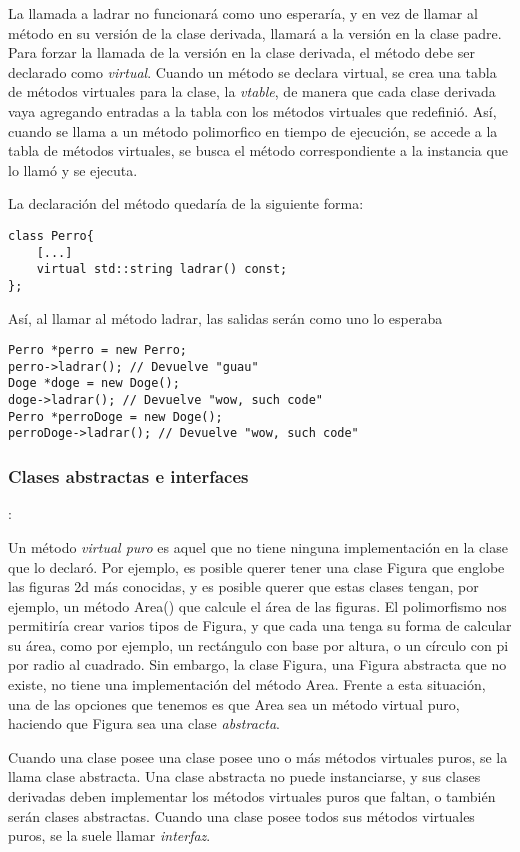 \documentclass[a4paper, twoside]{article}
\begin{document}
La llamada a ladrar no funcionará como uno esperaría, y en vez de llamar al método en su versión de la clase derivada, llamará a la versión en la clase padre.
Para forzar la llamada de la versión en la clase derivada, el método debe ser declarado como \emph{virtual}. Cuando un método se declara virtual, se crea una tabla de métodos virtuales para la clase, la \emph{vtable}, de manera que cada clase derivada vaya agregando entradas a la tabla con los métodos virtuales que redefinió.
Así, cuando se llama a un método polimorfico en tiempo de ejecución, se accede a la tabla de métodos virtuales, se busca el método correspondiente a la instancia que lo llamó y se ejecuta.

La declaración del método quedaría de la siguiente forma:

\begin{lstlisting}
class Perro{
	[...]
	virtual std::string ladrar() const;
};
\end{lstlisting}

Así, al llamar al método ladrar, las salidas serán como uno lo esperaba

\begin{lstlisting}
Perro *perro = new Perro;
perro->ladrar(); // Devuelve "guau"
Doge *doge = new Doge();
doge->ladrar(); // Devuelve "wow, such code"
Perro *perroDoge = new Doge();
perroDoge->ladrar(); // Devuelve "wow, such code"
\end{lstlisting}

\subsubsection{Clases abstractas e interfaces}:

Un método \emph{virtual puro} es aquel que no tiene ninguna implementación en la clase que lo declaró. Por ejemplo, es posible querer tener una clase Figura que englobe las figuras 2d más conocidas, y es posible querer que estas clases tengan, por ejemplo, un método Area() que calcule el área de las figuras.
El polimorfismo nos permitiría crear varios tipos de Figura, y que cada una tenga su forma de calcular su área, como por ejemplo, un rectángulo con base por altura, o un círculo con pi por radio al cuadrado. Sin embargo, la clase Figura, una Figura abstracta que no existe, no tiene una implementación del método Area. Frente a esta situación, una de las opciones que tenemos es que Area sea un método virtual puro, haciendo que Figura sea una clase \emph{abstracta}.

Cuando una clase posee una clase posee uno o más métodos virtuales puros, se la llama clase abstracta. Una clase abstracta no puede instanciarse, y sus clases derivadas deben implementar los métodos virtuales puros que faltan, o también serán clases abstractas. Cuando una clase posee todos sus métodos virtuales puros, se la suele llamar \emph{interfaz}.
\end{document}
